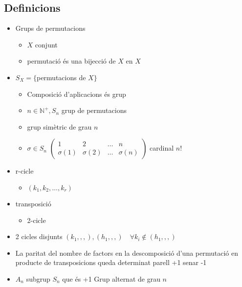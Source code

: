 \documentclass{article}
\newcommand{\N}{\mathbb{N}}
\begin{document}
\subsection{Definicions}
\begin{itemize}
\item Grups de permutacions
	\begin{itemize}
	\item $X$ conjunt
	\item permutació és una bijecció de $X$ en $X$
	\end{itemize}
\item $S_X = \{$permutacions de $X\}$
	\begin{itemize}
	\item Composició d'aplicacions és grup
	\item $n \in \N^+, S_n$ grup de permutacions
	\item grup simètric de grau $n$
	\item $\sigma \in S_n$
		\subitem $\begin{pmatrix}1 & 2 & \dots & n\\ \sigma(1) & \sigma(2) & \dots & \sigma(n)\end{pmatrix}$ cardinal $n!$
	\end{itemize}
\item r-cicle
	\begin{itemize}
	\item $(k_1, k_2, \dots, k_r)$
	\end{itemize}
\item transposició
	\begin{itemize}
	\item 2-cicle
	\end{itemize}
\item 2 cicles disjunts
	\subitem $(k_1,,,), (h_1,,,)\quad \forall k_i \notin (h_1,,,)$
\item La paritat del nombre de factors en la descomposició d'una permutació en producte de transposicions queda determinat
	\subitem[Si] parell +1
	\subitem[Si] senar -1
\item $A_n$ subgrup $S_n$ que és +1
	\subitem Grup alternat de grau $n$
\end{itemize}

\end{document}
